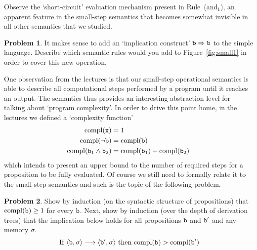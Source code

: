 \documentclass[a4paper, 11pt]{article}
\theoremstyle{definition}
\newtheorem{problem}{Problem}
\begin{document}
        Observe the `short-circuit' evaluation mechanism present in Rule~(and$_1$), an
        apparent feature in the small-step semantics that becomes somewhat invisible in
        all other semantics that we studied.
        \begin{problem}
                It makes sense to add an `implication construct' $\mathtt{b}
                \Rightarrow \mathtt{b}$ to the simple language. Describe which semantic
                rules would you add to Figure~\ref{fig:small1} in order to
                cover this new operation.
        \end{problem}

        One observation from the lectures is that our small-step operational
        semantics is able to describe all computational steps performed by a
        program until it reaches an output. The semantics thus provides an
        interesting abstraction level for talking about `program complexity'.
        In order to drive this point home, in the lectures we defined a
        `complexity function'
        \begin{align*}
                \mathrm{compl}(\mathtt{x}) & = 1  \\
                \mathrm{compl}(\mathtt{\neg b}) & = \mathrm{compl}(\mathtt{b}) \\
                \mathrm{compl}(\mathtt{b}_1 \wedge \mathtt{b}_2) & =
                \mathrm{compl}(\mathtt{b}_1) + \mathrm{compl}(\mathtt{b}_2)
        \end{align*}
        which intends to present an upper bound to the number of required steps
        for a proposition to be fully evaluated. Of course we still need to
        formally relate it to the small-step semantics and such is the topic of
        the following problem.

        \begin{problem}
                Show by induction (on the syntactic structure of propositions)
                that $\mathrm{compl}(\mathtt{b}) \geq 1$ for every $\mathtt{b}$.
                Next, show by induction (over the depth of derivation trees)
                that the implication below holds for all propositions
                $\mathtt{b}$ and $\mathtt{b'}$ and any memory $\sigma$.
                \[
                        \text{ If }\langle \mathtt{b}, \sigma \rangle \longrightarrow
                        \langle \mathtt{b'}, \sigma \rangle
                        \text{ then } \mathrm{compl}(\mathtt{b}) > \mathrm{compl}(\mathtt{b'})
                \]
        \end{problem}
\end{document}
